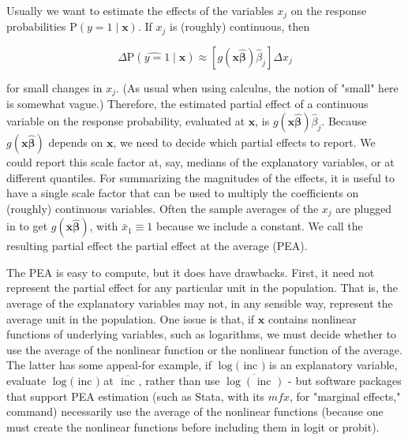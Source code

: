 \documentclass[10pt]{article}
\begin{document}
Usually we want to estimate the effects of the variables $x_{j}$ on the response probabilities $\mathrm{P}(y=1 \mid \mathbf{x})$. If $x_{j}$ is (roughly) continuous, then


\begin{equation*}
\Delta \mathrm{P}(\widehat{y=} 1 \mid \mathbf{x}) \approx\left[g(\mathbf{x} \hat{\boldsymbol{\beta}}) \hat{\beta}_{j}\right] \Delta x_{j} \tag{15.29}
\end{equation*}


for small changes in $x_{j}$. (As usual when using calculus, the notion of "small" here is somewhat vague.) Therefore, the estimated partial effect of a continuous variable on the response probability, evaluated at $\mathbf{x}$, is $g(\mathbf{x} \hat{\boldsymbol{\beta}}) \hat{\beta}_{j}$. Because $g(\mathbf{x} \hat{\boldsymbol{\beta}})$ depends on $\mathbf{x}$, we need to decide which partial effects to report. We could report this scale factor at, say, medians of the explanatory variables, or at different quantiles. For summarizing the magnitudes of the effects, it is useful to have a single scale factor that can be used to multiply the coefficients on (roughly) continuous variables. Often the sample averages of the $x_{j}$ are plugged in to get $g(\overline{\mathbf{x}} \hat{\boldsymbol{\beta}})$, with $\bar{x}_{1} \equiv 1$ because we include a constant. We call the resulting partial effect the partial effect at the average (PEA).

The PEA is easy to compute, but it does have drawbacks. First, it need not represent the partial effect for any particular unit in the population. That is, the average of the explanatory variables may not, in any sensible way, represent the average unit in the population. One issue is that, if $\mathbf{x}$ contains nonlinear functions of underlying variables, such as logarithms, we must decide whether to use the average of the nonlinear function or the nonlinear function of the average. The latter has some appeal-for example, if $\log ($ inc $)$ is an explanatory variable, evaluate $\log ($ inc $)$ at $\overline{\text { inc }}$, rather than use $\overline{\log (\text { inc })}$ - but software packages that support PEA estimation (such as Stata, with its $m f x$, for "marginal effects," command) necessarily use the average of the nonlinear functions (because one must create the nonlinear functions before including them in logit or probit).
\end{document}

